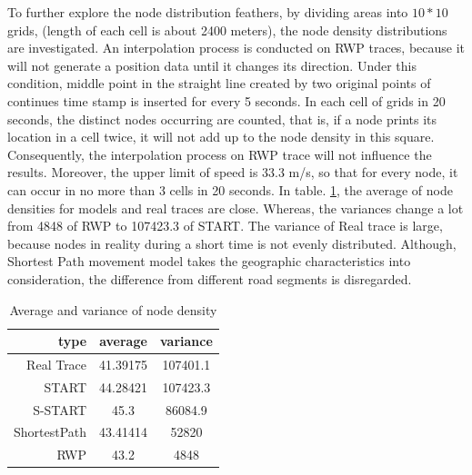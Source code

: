 To further explore the node distribution feathers, by dividing areas into $10*10$ grids, (length of each cell is about 2400 meters), the node density distributions are investigated. An interpolation process is conducted on RWP traces, because it will not generate a position data until it changes its direction. Under this condition, middle point in the straight line created by two original points of continues time stamp is inserted for every 5 seconds. In each cell of grids in 20 seconds, the distinct nodes occurring are counted, that is, if a node prints its location in a cell twice, it will not add up to the node density in this square. Consequently, the interpolation process on RWP trace will not influence the results. Moreover, the upper limit of speed is 33.3 m/s, so that for every node, it can occur in no more than 3 cells in 20 seconds.  In table. \ref{figure_avg_var_node_density}, the average of node densities for models and real traces are close. Whereas, the variances change a lot from 4848 of RWP to 107423.3 of START. The variance of Real trace is large, because nodes in reality during a short time is not evenly distributed. Although, Shortest Path movement model takes the geographic characteristics into consideration, the difference from different road segments is disregarded.

\begin{table}
\centering
\caption{Average and variance of node density}\label{figure_avg_var_node_density}
\begin{tabular}{r|c|c}
  \hline
 type & average & variance\\
  \hline
  Real Trace & 41.39175 & 107401.1 \\
  START & 44.28421 & 107423.3 \\
  S-START & 45.3 & 86084.9\\
  ShortestPath & 43.41414 & 52820\\
  RWP & 43.2 & 4848 \\
  \hline
\end{tabular}
\end{table}

